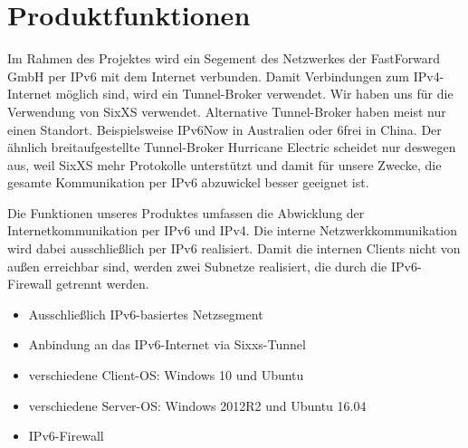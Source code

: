 \section{Produktfunktionen}

Im Rahmen des Projektes wird ein Segement des Netzwerkes der FastForward GmbH per IPv6 mit dem Internet verbunden. Damit Verbindungen zum IPv4-Internet möglich sind, wird ein Tunnel-Broker verwendet. Wir haben uns für die Verwendung von SixXS verwendet. Alternative Tunnel-Broker haben meist nur einen Standort. Beispielsweise IPv6Now in Australien oder 6frei in China. Der ähnlich breitaufgestellte Tunnel-Broker Hurricane Electric scheidet nur deswegen aus, weil SixXS mehr Protokolle unterstützt und damit für unsere Zwecke, die gesamte Kommunikation per IPv6 abzuwickel besser geeignet ist.

Die Funktionen unseres Produktes umfassen die Abwicklung der Internetkommunikation per IPv6 und IPv4. Die interne Netzwerkkommunikation wird dabei ausschließlich per IPv6 realisiert. Damit die internen Clients nicht von außen erreichbar sind, werden zwei Subnetze realisiert, die durch die IPv6-Firewall getrennt werden.

\begin{itemize}
	\item Ausschließlich IPv6-basiertes Netzsegment
	\item Anbindung an das IPv6-Internet via Sixxs-Tunnel
	\item verschiedene Client-OS: Windows 10 und Ubuntu
	\item verschiedene Server-OS: Windows 2012R2 und Ubuntu 16.04
	\item IPv6-Firewall
\end{itemize}

